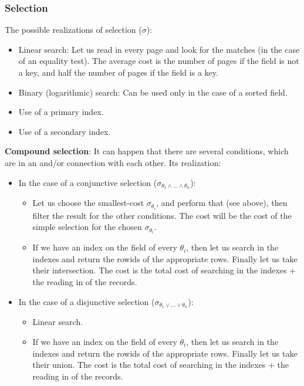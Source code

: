 \documentclass[margin=0px]{article}
\begin{document}
\subsubsection{Selection}

The possible realizations of selection ($\sigma$):
\begin{itemize}
    \item	Linear search: Let us read in every page and look for the matches (in the case of an equality test).
          The average cost is the number of pages if the field is not a key, and half the number of pages if the field is a key.
    \item	Binary (logarithmic) search: Can be used only in the case of a sorted field.
    \item	Use of a primary index.
    \item	Use of a secondary index.
\end{itemize}

\noindent \textbf{Compound selection}: It can happen that there are several conditions, which are in an and/or connection with each other.
Its realization:
\begin{itemize}
    \item	In the case of a conjunctive selection ($\sigma_{\theta_{1} \wedge ... \wedge \theta_{n}}$):
          \begin{itemize}
              \item	Let us choose the smallest-cost $\sigma_{\theta_{i}}$, and perform that (see above),
                    then filter the result for the other conditions. The cost will be the cost of the simple selection for the chosen $\sigma_{\theta_{i}}$.

              \item	If we have an index on the field of every $\theta_{i}$, then let us search in the indexes and return the rowids of the appropriate
                    rows. Finally let us take their intersection. The cost is the total cost of searching in the indexes + the reading in of the records.
          \end{itemize}

    \item	In the case of a disjunctive selection ($\sigma_{\theta_{1} \vee ... \vee \theta_{n}}$):
          \begin{itemize}
              \item	Linear search.

              \item	If we have an index on the field of every $\theta_{i}$, then let us search in the indexes and return the rowids of the appropriate
                    rows. Finally let us take their union. The cost is the total cost of searching in the indexes + the reading in of the records.
          \end{itemize}
\end{itemize}
\end{document}
